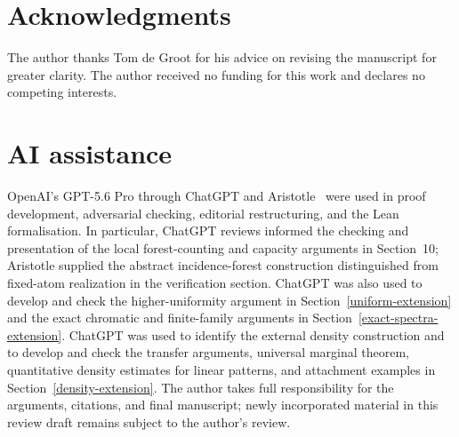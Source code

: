 \documentclass[a4paper,11pt,reqno]{amsart}
\theoremstyle{plain}
\theoremstyle{definition}
\theoremstyle{remark}
\begin{document}
\section*{Acknowledgments}

The author thanks Tom de Groot for his advice on revising the manuscript for
greater clarity.
The author received no funding for this work and declares no competing
interests.

\section*{AI assistance}

OpenAI's GPT-5.6 Pro through ChatGPT and Aristotle~\citep{achim-et-al-2025}
were used in proof development, adversarial checking, editorial
restructuring, and the Lean formalisation.  In particular, ChatGPT reviews
informed the checking and presentation of the local forest-counting and
capacity arguments in Section~10; Aristotle supplied the abstract
incidence-forest construction distinguished from fixed-atom realization in
the verification section.  ChatGPT was also used to develop and check
the higher-uniformity argument in Section~\ref{uniform-extension}
and the exact chromatic and finite-family arguments in
Section~\ref{exact-spectra-extension}.  ChatGPT was used to
identify the external density construction and to develop and check
the transfer arguments, universal marginal theorem, quantitative
density estimates for linear patterns, and attachment examples in
Section~\ref{density-extension}.
The author takes full responsibility for the
arguments, citations, and final manuscript; newly incorporated material in
this review draft remains subject to the author's review.
\end{document}
